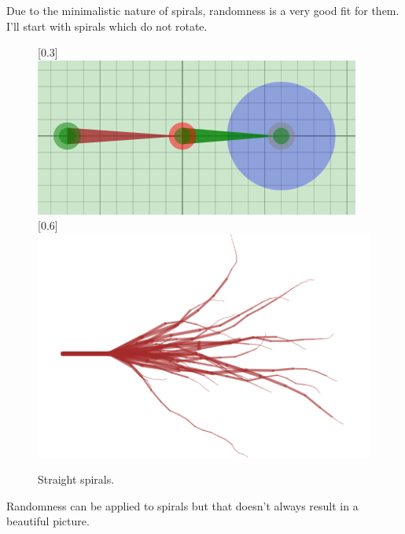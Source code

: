 			Due to the minimalistic nature of spirals, randomness is a very good fit for them.
			I'll start with spirals which do not rotate.

			\begin{figure}[H]
				\centering
				\caption{Straight spirals.}
				[0.3\textwidth]
					{\includegraphics[width=0.29\TW]{img/Randomness/Node/ran_spir_set_01.png}}
				~
				[0.6\textwidth]
					{\includegraphics[width=0.59\TW]{img/Randomness/Node/ran_spir_01.png}}
			\end{figure}

			Randomness can be applied to  spirals but that doesn't always result in a beautiful picture.

